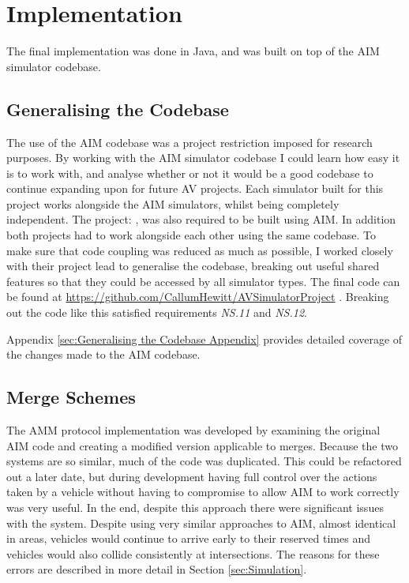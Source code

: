 \chapter{Implementation}
\label{cha:Implementation}
The final implementation was done in Java, and was built on top of the AIM simulator codebase.

\section{Generalising the Codebase}
\label{sec:Generalising the Codebase}
The use of the AIM codebase was a project restriction imposed for research purposes. By working with the AIM simulator codebase I could learn how easy it is to work with, and analyse whether or not it would be a good codebase to continue expanding upon for future AV projects. Each simulator built for this project works alongside the AIM simulators, whilst being completely independent. The project:  \citep{Milligan2017}, was also required to be built using AIM. In addition both projects had to work alongside each other using the same codebase. To make sure that code coupling was reduced as much as possible, I worked closely with their project lead to generalise the codebase, breaking out useful shared features so that they could be accessed by all simulator types. The final code can be found at \url{https://github.com/CallumHewitt/AVSimulatorProject} \citep{Codebase}. Breaking out the code like this satisfied requirements \emph{NS.11} and \emph{NS.12}.

Appendix \ref{sec:Generalising the Codebase Appendix} provides detailed coverage of the changes made to the AIM codebase.
\section{Merge Schemes}
\label{sec:Merge Schemes}
The AMM protocol implementation was developed by examining the original AIM code and creating a modified version applicable to merges. Because the two systems are so similar, much of the code was duplicated. This could be refactored out a later date, but during development having full control over the actions taken by a vehicle without having to compromise to allow AIM to work correctly was very useful. In the end, despite this approach there were significant issues with the system. Despite using very similar approaches to AIM, almost identical in areas, vehicles would continue to arrive early to their reserved times and vehicles would also collide consistently at intersections. The reasons for these errors are described in more detail in Section \ref{sec:Simulation}.

